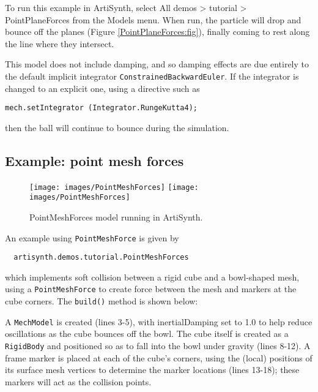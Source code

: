 To run this example in ArtiSynth, select {\sf All demos > tutorial >
PointPlaneForces} from the {\sf Models} menu. When run, the particle will drop
and bounce off the planes (Figure \ref{PointPlaneForces:fig}), finally coming
to rest along the line where they intersect.

This model does not include damping, and so damping effects are due entirely to
the default implicit integrator {\tt ConstrainedBackwardEuler}. If the
integrator is changed to an explicit one, using a directive such as
%
\begin{lstlisting}[]
  mech.setIntegrator (Integrator.RungeKutta4);
\end{lstlisting}
%
then the ball will continue to bounce during the simulation.

\subsection{Example: point mesh forces}

\begin{figure}[h]
\begin{center}
\iflatexml
 \texttt{[image: images/PointMeshForces]}
\else
 \texttt{[image: images/PointMeshForces]}
\fi
\end{center}
\caption{PointMeshForces model running in ArtiSynth.}
\label{PointMeshForces:fig}
\end{figure}

An example using {\tt PointMeshForce} is given by
%
\begin{verbatim}
  artisynth.demos.tutorial.PointMeshForces
\end{verbatim}
%
which implements soft collision between a rigid cube and a bowl-shaped mesh,
using a {\tt PointMeshForce} to create force between the mesh and markers at
the cube corners. The {\tt build()} method is shown below:
%
\lstset{numbers=left}
\iflatexml

\else

\fi
\lstset{numbers=none}
%

A {\tt MechModel} is created (lines 3-5), with {\sf inertialDamping} set to 1.0
to help reduce oscillations as the cube bounces off the bowl. The cube itself
is created as a {\tt RigidBody} and positioned so as to fall into the bowl
under gravity (lines 8-12). A frame marker is placed at each of the cube's
corners, using the (local) positions of its surface mesh vertices to determine
the marker locations (lines 13-18); these markers will act as the collision
points.

